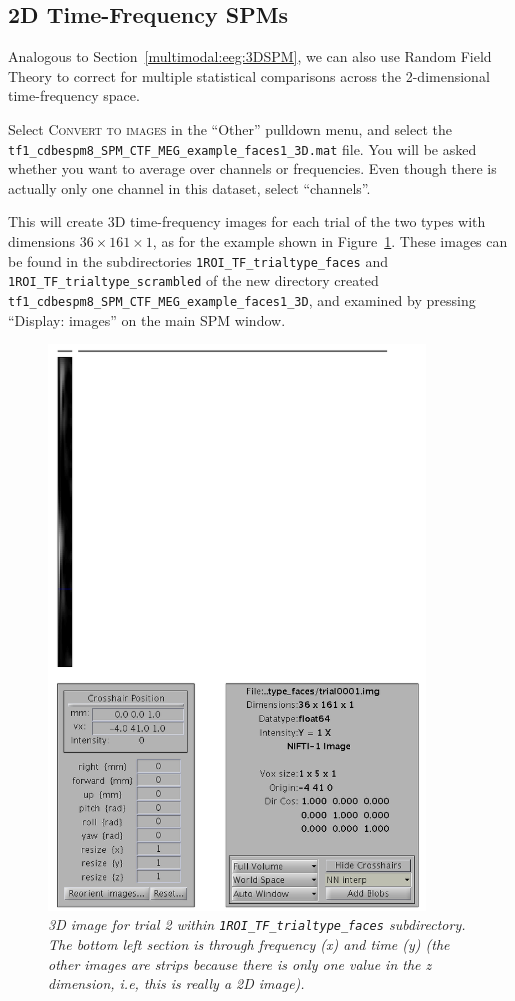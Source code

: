 \subsection{2D Time-Frequency SPMs}

Analogous to Section~\ref{multimodal:eeg:3DSPM}, we can also use Random Field Theory to correct for multiple statistical comparisons across the 2-dimensional time-frequency space.

Select \textsc{Convert to images} in the ``Other'' pulldown menu, and select the \texttt{tf1\_cdbespm8\_\-SPM\_\-CTF\_\-MEG\_\-example\_\-faces1\_\-3D.mat} file. You will be asked whether you want to average over channels or frequencies. Even though there is actually only one channel in this dataset, select ``channels''.

This will create 3D time-frequency images for each trial of the two types with dimensions $36\times 161\times 1$, as for the example shown in Figure~\ref{multimodal:fig:15}. These images can be found in the subdirectories \texttt{1ROI\_TF\_\-trialtype\_\-faces} and \texttt{1ROI\_TF\_\-trialtype\_\-scrambled} of the new directory created \texttt{tf1\_\-cdbespm8\_\-SPM\_\-CTF\_\-MEG\_\-example\_\-faces1\_3D}, and examined by pressing ``Display: images'' on the main SPM window.

\begin{figure}
\begin{center}
\includegraphics[width=100mm]{multimodal/figures/meg_TFimage}
\caption{\em  3D image for trial 2 within \texttt{1ROI\_TF\_trialtype\_faces} subdirectory. The bottom left section is through frequency (x) and time (y) (the other images are strips because there is only one value in the z dimension, i.e, this is really a 2D image).\label{multimodal:fig:15}}
\end{center}
\end{figure}

